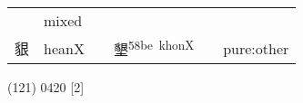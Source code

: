 \documentclass[14pt,a4paper]{scrartcl}
\begin{document}
\begin{longtable}[c]{@{}llllll@{}}
\begin{minipage}[t]{0.14\columnwidth}
\strut\end{minipage} &
\begin{minipage}[t]{0.14\columnwidth}\raggedright\strut
mixed
\strut\end{minipage}\tabularnewline
\begin{minipage}[t]{0.14\columnwidth}\raggedright\strut
貇
\strut\end{minipage} &
\begin{minipage}[t]{0.14\columnwidth}\raggedright\strut
heanX
\strut\end{minipage} &
\begin{minipage}[t]{0.14\columnwidth}\raggedright\strut
\strut\end{minipage} &
\begin{minipage}[t]{0.14\columnwidth}\raggedright\strut
墾\textsuperscript{58be~khonX}
\strut\end{minipage} &
\begin{minipage}[t]{0.14\columnwidth}\raggedright\strut
\strut\end{minipage} &
\begin{minipage}[t]{0.14\columnwidth}\raggedright\strut
pure:other
\strut\end{minipage}\tabularnewline
\bottomrule
\end{longtable}

(121) 0420 {[}2{]}
\end{document}
